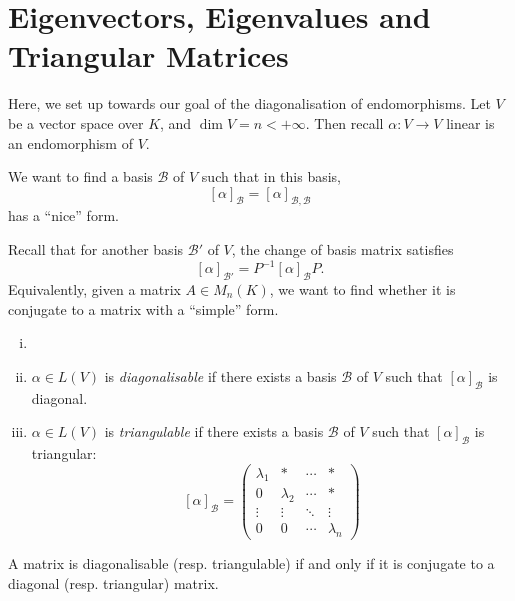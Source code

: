 \documentclass[12pt]{article}
\begin{document}
\newpage

\section{Eigenvectors, Eigenvalues and Triangular Matrices}%
\label{sec:eigenvectors_eigenvalues_and_triangular_matrices}

Here, we set up towards our goal of the diagonalisation of endomorphisms. Let $V$ be a vector space over $K$, and $\dim V = n < +\infty$. Then recall $\alpha : V \to V$ linear is an endomorphism of $V$.

We want to find a basis $\mathcal{B}$ of $V$ such that in this basis,
\[
	[\alpha]_{\mathcal{B}} = [\alpha]_{\mathcal{B}, \mathcal{B}}
\]
has a ``nice'' form.

Recall that for another basis $\mathcal{B}'$ of $V$, the change of basis matrix satisfies
\[
	[\alpha]_{\mathcal{B}'} = P^{-1}[\alpha]_{\mathcal{B}}P
.\]
Equivalently, given a matrix $A \in M_n(K)$, we want to find whether it is conjugate to a matrix with a ``simple'' form.

\begin{definition}
	\begin{enumerate}[(i)]
		\item[]
		\item $\alpha \in L(V)$ is \textit{diagonalisable} if there exists a basis $\mathcal{B}$ of $V$ such that $[\alpha]_{\mathcal{B}}$ is diagonal.
		\item $\alpha \in L(V)$ is \textit{triangulable} if there exists a basis $\mathcal{B}$ of $V$ such that $[\alpha]_{\mathcal{B}}$ is triangular:
			\[
				[\alpha]_{\mathcal{B}}=
				\begin{pmatrix}
					\lambda_1 & \ast & \cdots & \ast \\
					0 & \lambda_2 & \cdots & \ast \\
					\vdots & \vdots & \ddots & \vdots \\
					0 & 0 & \cdots & \lambda_n
				\end{pmatrix}
			\]
	\end{enumerate}
\end{definition}

\begin{remark}
	A matrix is diagonalisable (resp. triangulable) if and only if it is conjugate to a diagonal (resp. triangular) matrix.
\end{remark}
\end{document}
